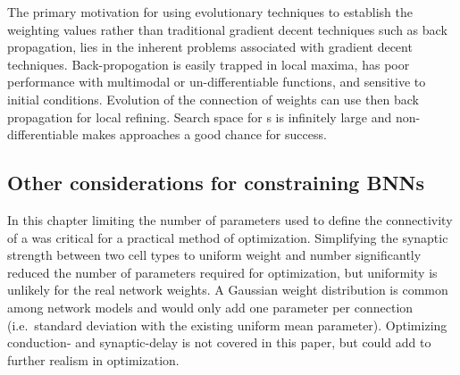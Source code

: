 The primary motivation for using evolutionary techniques to establish the
weighting values rather than traditional gradient decent techniques such as
back propagation, lies in the inherent problems associated with gradient
decent techniques. Back-propogation is easily trapped in local maxima, has
poor performance with multimodal or un-differentiable functions, and
sensitive to initial conditions. Evolution of the connection of weights can
use {\GAs} then back propagation for local refining. Search space for {\BNN}s
is infinitely large and non-differentiable makes {\GA} approaches a good
chance for success.




\subsection{Other considerations for constraining {BNN}s}\label{sec:GA:other-considerations}

In this chapter limiting the number of parameters used to define the
connectivity of a {\BNN} was critical for a practical method of
optimization. Simplifying the synaptic strength between two cell types to
uniform weight and number significantly reduced the number of parameters
required for optimization, but uniformity is unlikely for the real network
weights.  A Gaussian weight distribution is common among network models and
would only add one parameter per connection (i.e.\ standard deviation with
the existing uniform mean parameter).  Optimizing conduction- and
synaptic-delay is not covered in this paper, but could add to further
realism in {\BNN} optimization.

\smallskip{}

